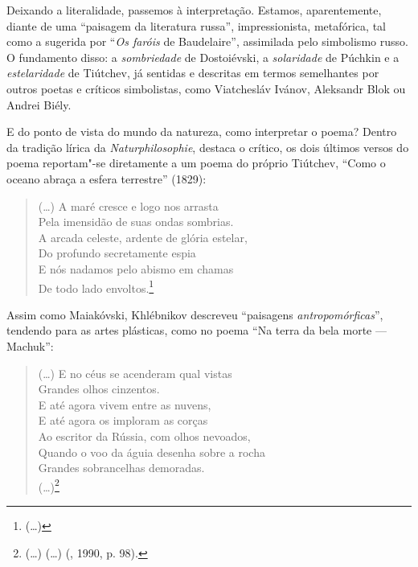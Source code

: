 Deixando a literalidade, passemos à interpretação.
Estamos, aparentemente, diante de uma ``paisagem da literatura russa'',
impressionista, metafórica, tal como a sugerida por ``\emph{Os faróis} de
Baudelaire'', assimilada pelo simbolismo russo. O fundamento disso: a
\emph{sombriedade} de Dostoiévski, a \emph{solaridade} de Púchkin e a
\emph{estelaridade} de Tiútchev, já sentidas e descritas
em termos semelhantes por outros poetas e críticos simbolistas, como Viatchesláv
Ivánov, Aleksandr Blok ou Andrei Biély. 

E do ponto de vista do mundo da natureza, como interpretar o poema?
Dentro da tradição lírica da \emph{Naturphilosophie}, destaca o crítico, os dois últimos
versos do poema reportam"-se diretamente a um poema do próprio Tiútchev,
``Como o oceano abraça a esfera terrestre'' (1829):

\begin{verse}
(\ldots{})
A maré cresce e logo nos arrasta \\
Pela imensidão de suas ondas sombrias. \\[8pt]
A arcada celeste, ardente de glória estelar, \\
Do profundo secretamente espia \\
E nós nadamos pelo abismo em chamas \\
De todo lado envoltos.\footnote{(\ldots{}) {}}

\end{verse}

Assim como Maiakóvski, Khlébnikov descreveu ``paisagens
\emph{antropomórficas}'', tendendo para as artes plásticas, como no poema ``Na
terra da bela morte --- Machuk'':

\begin{verse}
(\ldots{})
E no céus se acenderam qual vistas \\
Grandes olhos cinzentos. \\
E até agora vivem entre as nuvens, \\
E até agora os imploram as corças \\
Ao escritor da Rússia, com olhos nevoados, \\
Quando o voo da águia desenha sobre a \qb{}rocha \\
Grandes sobrancelhas demoradas. \\
(\ldots{})\footnote{(\ldots{}) {} (\ldots{}) (, 1990, p.
  98).}
\end{verse}


